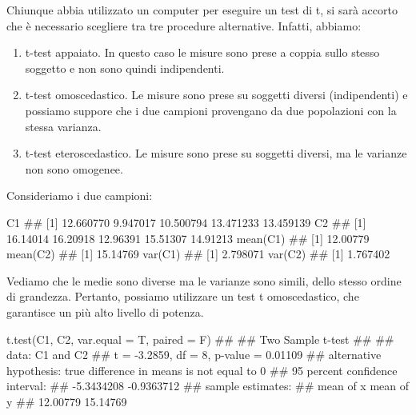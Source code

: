 \documentclass[a4paper,12pt,oneside]{book}
\providecommand{\tightlist}{%
  \setlength{\itemsep}{0pt}\setlength{\parskip}{0pt}}
\newenvironment{Shaded}{}{}
\newcommand{\KeywordTok}[1]{#1}
\newcommand{\DataTypeTok}[1]{#1}
\newcommand{\CommentTok}[1]{#1}
\newcommand{\NormalTok}[1]{#1}
\begin{document}
Chiunque abbia utilizzato un computer per eseguire un test di t, si sarà accorto che è necessario scegliere tra tre procedure alternative. Infatti, abbiamo:

\begin{enumerate}
\def\labelenumi{\arabic{enumi}.}
\tightlist
\item
  t-test appaiato. In questo caso le misure sono prese a coppia sullo stesso soggetto e non sono quindi indipendenti.
\item
  t-test omoscedastico. Le misure sono prese su soggetti diversi (indipendenti) e possiamo suppore che i due campioni provengano da due popolazioni con la stessa varianza.
\item
  t-test eteroscedastico. Le misure sono prese su soggetti diversi, ma le varianze non sono omogenee.
\end{enumerate}

Consideriamo i due campioni:

\begin{Shaded}
\begin{Highlighting}[]
\NormalTok{C1}
\CommentTok{## [1] 12.660770  9.947017 10.500794 13.471233 13.459139}
\NormalTok{C2}
\CommentTok{## [1] 16.14014 16.20918 12.96391 15.51307 14.91213}
\KeywordTok{mean}\NormalTok{(C1)}
\CommentTok{## [1] 12.00779}
\KeywordTok{mean}\NormalTok{(C2)}
\CommentTok{## [1] 15.14769}
\KeywordTok{var}\NormalTok{(C1)}
\CommentTok{## [1] 2.798071}
\KeywordTok{var}\NormalTok{(C2)}
\CommentTok{## [1] 1.767402}
\end{Highlighting}
\end{Shaded}

Vediamo che le medie sono diverse ma le varianze sono simili, dello stesso ordine di grandezza. Pertanto, possiamo utilizzare un test t omoscedastico, che garantisce un più alto livello di potenza.

\begin{Shaded}
\begin{Highlighting}[]
\KeywordTok{t.test}\NormalTok{(C1, C2, }\DataTypeTok{var.equal =}\NormalTok{ T, }\DataTypeTok{paired =}\NormalTok{ F)}
\CommentTok{## }
\CommentTok{##  Two Sample t-test}
\CommentTok{## }
\CommentTok{## data:  C1 and C2}
\CommentTok{## t = -3.2859, df = 8, p-value = 0.01109}
\CommentTok{## alternative hypothesis: true difference in means is not equal to 0}
\CommentTok{## 95 percent confidence interval:}
\CommentTok{##  -5.3434208 -0.9363712}
\CommentTok{## sample estimates:}
\CommentTok{## mean of x mean of y }
\CommentTok{##  12.00779  15.14769}
\end{Highlighting}
\end{Shaded}
\end{document}
